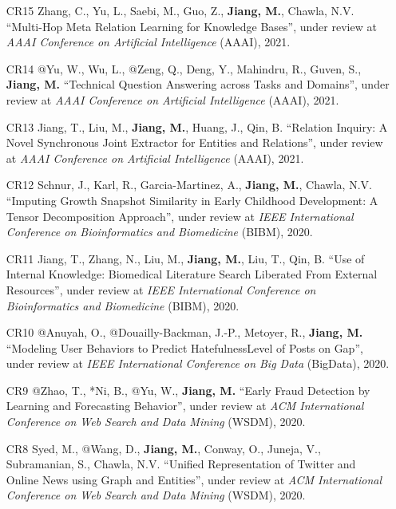 \documentclass[10pt]{article}
\newenvironment{myindentpar}[1]%
{\begin{list}{}%
         {\setlength{\leftmargin}{#1}}%
         \item[]%
}
{\end{list}}
\newcounter{list}
\begin{document}
\begin{myindentpar}{0.00cm}
\begin{enumerate}[leftmargin=.5cm]
\item[CR15] Zhang, C., Yu, L., Saebi, M., Guo, Z., \textbf{Jiang, M.}, Chawla, N.V. ``Multi-Hop Meta Relation Learning for Knowledge Bases'', under review at \textit{AAAI Conference on Artificial Intelligence} (AAAI), 2021.

\item[CR14] @Yu, W., Wu, L., @Zeng, Q., Deng, Y., Mahindru, R., Guven, S., \textbf{Jiang, M.} ``Technical Question Answering across Tasks and Domains'', under review at \textit{AAAI Conference on Artificial Intelligence} (AAAI), 2021.	

\item[CR13] Jiang, T., Liu, M., \textbf{Jiang, M.}, Huang, J., Qin, B. ``Relation Inquiry: A Novel Synchronous Joint Extractor for Entities and Relations'', under review at \textit{AAAI Conference on Artificial Intelligence} (AAAI), 2021.

\item[CR12] Schnur, J., Karl, R., Garcia-Martinez, A., \textbf{Jiang, M.}, Chawla, N.V. ``Imputing Growth Snapshot Similarity in Early Childhood Development: A Tensor Decomposition Approach'', under review at \textit{IEEE International Conference on Bioinformatics and Biomedicine} (BIBM), 2020.

\item[CR11] Jiang, T., Zhang, N., Liu, M., \textbf{Jiang, M.}, Liu, T., Qin, B. ``Use of Internal Knowledge: Biomedical Literature Search Liberated From External Resources'', under review at \textit{IEEE International Conference on Bioinformatics and Biomedicine} (BIBM), 2020.

\item[CR10] @Anuyah, O., @Douailly-Backman, J.-P., Metoyer, R., \textbf{Jiang, M.} ``Modeling User Behaviors to Predict HatefulnessLevel of Posts on Gap'', under review at \textit{IEEE International Conference on Big Data} (BigData), 2020.
		
\item[CR9] @Zhao, T., *Ni, B., @Yu, W., \textbf{Jiang, M.} ``Early Fraud Detection by Learning and Forecasting Behavior'', under review at \textit{ACM International Conference on Web Search and Data Mining} (WSDM), 2020.

\item[CR8] Syed, M., @Wang, D., \textbf{Jiang, M.}, Conway, O., Juneja, V., Subramanian, S., Chawla, N.V. ``Unified Representation of Twitter and Online News using Graph and Entities'', under review at \textit{ACM International Conference on Web Search and Data Mining} (WSDM), 2020.


\end{enumerate}
\end{myindentpar}
\end{document}
